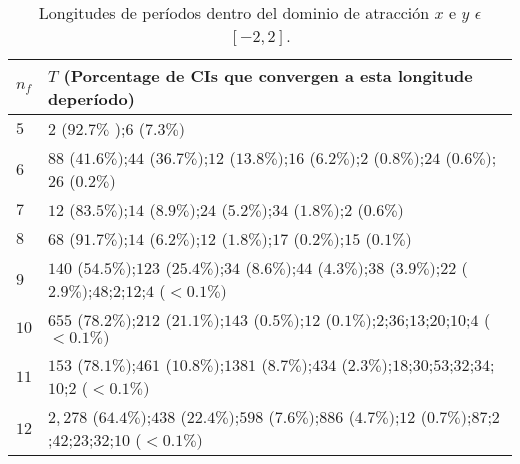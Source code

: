\begin{table*}[!t]
	\renewcommand{\arraystretch}{1.3}
	\caption{Longitudes de períodos dentro del dominio de atracción $x$ e $y$ $\epsilon$  $[-2,2]$.}
	\label{tabla}
	\centering
	\fontsize{9}{9}\selectfont
	\begin{tabular}{l  l  }
		\hline
		$n_f$   & $T$ {\scriptsize(Porcentage de CIs que convergen a esta longitude deperíodo)}\\ \hline\hline
		$5$     & $2$ {\scriptsize($92.7\%$ )};$6$  {\scriptsize($7.3\% )$}                                                                                                                                                                  \\
		$6$     & $88$ {\scriptsize($41.6 \% )$};$44$ {\scriptsize($36.7 \% )$};$12$ {\scriptsize($13.8\% )$};$16$ {\scriptsize($6.2 \% )$};$2$ {\scriptsize($0.8 \% )$};$24$ {\scriptsize($0.6 \% )$};$26$ {\scriptsize($0.2 \%)$}          \\
		$7$     & $12$ {\scriptsize($83.5 \% )$};$14$ {\scriptsize($8.9\% )$};$24$ {\scriptsize($5.2\% )$};$34$ {\scriptsize($1.8 \% )$};$2$ {\scriptsize($0.6\% )$}                                                                         \\
		$8$     & $68$ {\scriptsize($91.7\%)$};$14$ {\scriptsize($6.2\%)$};$12$ {\scriptsize($1.8 \%)$};$17$ {\scriptsize($0.2\% )$};$15$ {\scriptsize($0.1 \%)$}                                                                            \\
		$9$     & $140$ {\scriptsize($54.5 \%)$};$123$ {\scriptsize($25.4 \%)$};$34$ {\scriptsize($8.6\%)$};$44$ {\scriptsize($4.3 \%)$};$38$ {\scriptsize($3.9 \%)$};$22$ {\scriptsize($2.9 \%)$};$48$;$2$;$12$;$4$ {\scriptsize($<0.1\%)$} \\
		$10$    & $655$ {\scriptsize($78.2\%)$};$212$ {\scriptsize($21.1\%)$};$143$ {\scriptsize($0.5\%)$};$12$ {\scriptsize($0.1\%)$};$2$;$36$;$13$;$20$;$10$;$4$ {\scriptsize($<0.1\%)$}                                                   \\
		$11$    & $153$ {\scriptsize($78.1\%)$};$461$ {\scriptsize($10.8\% )$};$1381$ {\scriptsize($8.7\%)$};$434$ {\scriptsize($2.3\%)$};$18$;$30$;$53$;$32$;$34$;$10$;$2$ {\scriptsize($<0.1\% )$}                                         \\
		$12$    & $2,278$ {\scriptsize($64.4\%)$};$438$ {\scriptsize($22.4\% )$};$598$ {\scriptsize($7.6\% )$};$886$ {\scriptsize($4.7 \%)$};$12$ {\scriptsize($0.7\%)$};$87$;$2$;$42$;$23$;$32$;$10$ {\scriptsize($<0.1\% )$}               \\

\end{tabular}
\end{table*}
